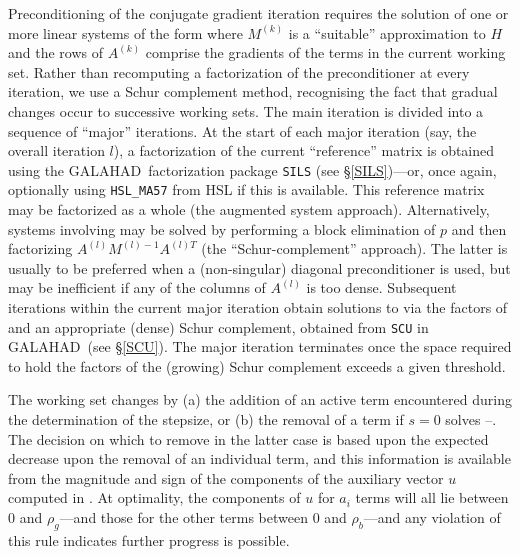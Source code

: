 \documentclass[twoside]{article}
\newcommand{\gal}{{\sf GALAHAD}}
\begin{document}
Preconditioning of the conjugate gradient iteration
requires the solution of one or more linear systems of the form
where $M^{(k)}$ is a ``suitable'' approximation to $H$
and the rows of $A^{(k)}$ comprise the gradients of the
terms in the current working set. Rather than recomputing a
factorization of the preconditioner at every iteration, we use a
Schur complement method, recognising the fact that
gradual changes occur to successive working sets. The main
iteration is divided into a sequence of ``major'' iterations.
At the start of each major iteration (say, the overall iteration $l$), 
a factorization of the
current ``reference'' matrix
is obtained using  the \gal\ factorization package
{\tt SILS} (see \S\ref{SILS})---or, once again, 
optionally using {\tt HSL\_MA57} from HSL if this is available.
This reference matrix may be factorized as a whole (the
augmented system approach). Alternatively, systems involving  may 
be solved by performing a block elimination of $p$ 
and then factorizing $A^{(l)} M^{(l)-1} A^{(l)T}$
(the ``Schur-complement'' approach). The latter is usually to be preferred 
when a (non-singular) diagonal 
preconditioner is used, but may be inefficient if any of the columns
of $A^{(l)}$ is too dense.
Subsequent iterations within the current major
iteration obtain solutions to  via the factors of 
and an appropriate (dense) Schur complement,
obtained from {\tt SCU} in \gal\ (see \S\ref{SCU}).
The major iteration terminates
once the space required to hold the factors of the (growing) Schur
complement exceeds a given threshold.

The working set changes by (a) 
the addition of an active term encountered during 
the determination of the stepsize, or (b) the removal of a term if $s = 0$
solves --. The  decision on which to remove in the latter 
case is based upon the expected decrease upon the removal of an individual term,
and this information is available from the magnitude and sign of the components
of the auxiliary vector $u$ computed in . At optimality, the
components of $u$ for $a_i$ terms will all lie between 
$0$ and $\rho_g$---and those for the other terms 
between $0$ and $\rho_b$---and any violation
of this rule indicates further progress is possible. 
\end{document}
